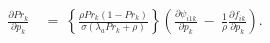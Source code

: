 \begin{equation}
\begin{split}
    \frac{\partial Pr_{k}}{\partial p_{k}} \
    & = \ \left\{ \frac{\rho Pr_{k} (1 - Pr_{k})}{\sigma (\lambda_{a} Pr_{k} + \rho)} \right\} \left( \frac{\partial \psi_{i1k}}{\partial p_{k}} \ - \ \frac{1}{\rho} \frac{\partial f_{ik}}{\partial p_{k}} \right).
\end{split}
\label{Equation:Equilibrium-Paths_Applying-IFT}
\end{equation}